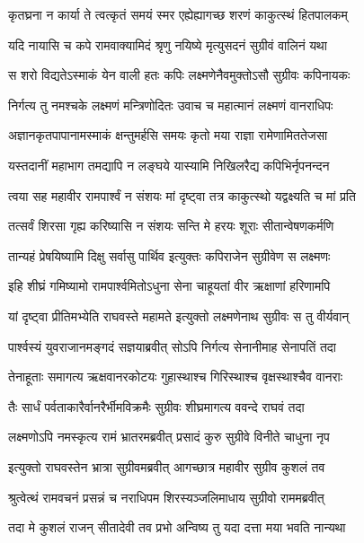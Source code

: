 \twolineshloka
{कृतघ्रना न कार्या ते त्वत्कृतं समयं स्मर}
{एह्येह्यागच्छ शरणं काकुत्स्थं हितपालकम्} %

\twolineshloka
{यदि नायासि च कपे रामवाक्यामिदं श्रृणु}
{नयिष्ये मृत्युसदनं सुग्रीवं वालिनं यथा} %

\twolineshloka
{स शरो विद्यतेऽस्माकं येन वाली हतः कपिः}
{लक्ष्मणेनैवमुक्तोऽसौ सुग्रीवः कपिनायकः} %

\twolineshloka
{निर्गत्य तु नमश्चके लक्ष्मणं मन्त्रिणोदितः}
{उवाच च महात्मानं लक्ष्मणं वानराधिपः} %

\twolineshloka
{अज्ञानकृतपापानामस्माकं क्षन्तुमर्हसि}
{समयः कृतो मया राज्ञा रामेणामिततेजसा} %

\twolineshloka
{यस्तदानीं महाभाग तमद्यापि न लङ्घये}
{यास्यामि निखिलरैद्य कपिभिर्नृपनन्दन} %

\twolineshloka
{त्वया सह महावीर रामपार्श्वं न संशयः}
{मां दृष्ट्वा तत्र काकुत्स्थो यद्वक्ष्यति च मां प्रति} %

\twolineshloka
{तत्सर्वं शिरसा गृह्य करिष्यासि न संशयः}
{सन्ति मे हरयः शूराः सीतान्वेषणकर्मणि} %

\twolineshloka
{तान्यहं प्रेषयिष्यामि दिक्षु सर्वासु पार्थिव}
{इत्युक्तः कपिराजेन सुग्रीवेण स लक्ष्मणः} %

\twolineshloka
{इहि शीघ्रं गमिष्यामो रामपार्श्वमितोऽधुना}
{सेना चाहूयतां वीर ऋक्षाणां हरिणामपि} %

\twolineshloka
{यां दृष्ट्वा प्रीतिमभ्येति राघवस्ते महामते}
{इत्युक्तो लक्ष्मणेनाथ सुग्रीवः स तु वीर्यवान्} %

\twolineshloka
{पार्श्वस्यं युवराजानमङ्गदं सज्ञयाब्रवीत्}
{सोऽपि निर्गत्य सेनानीमाह सेनापतिं तदा} %

\twolineshloka
{तेनाहूताः समागत्य ऋक्षवानरकोटयः}
{गुहास्थाश्च गिरिस्थाश्च वृक्षस्थाश्चैव वानराः} %

\twolineshloka
{तैः सार्धं पर्वताकारैर्वानरैर्भीमविक्रमैः}
{सुग्रीवः शीघ्रमागत्य ववन्दे राघवं तदा} %

\twolineshloka
{लक्ष्मणोऽपि नमस्कृत्य रामं भ्रातरमब्रवीत्}
{प्रसादं कुरु सुग्रीवे विनीते चाधुना नृप} %

\twolineshloka
{इत्युक्तो राघवस्तेन भ्रात्रा सुग्रीवमब्रवीत्}
{आगच्छात्र महावीर सुग्रीव कुशलं तव} %

\twolineshloka
{श्रुत्वेत्थं रामवचनं प्रसन्नं च नराधिपम}
{शिरस्यञ्जलिमाधाय सुग्रीवो राममब्रवीत्} %

\twolineshloka
{तदा मे कुशलं राजन् सीतादेवी तव प्रभो}
{अन्विष्य तु यदा दत्ता मया भवति नान्यथा} %

